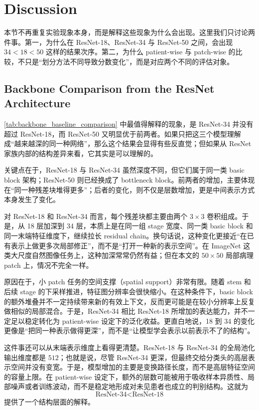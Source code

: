 \section{Discussion}
\label{sec:discussion}

本节不再重复实验现象本身，而是解释这些现象为什么会出现。这里我们只讨论两件事。第一，为什么在 ResNet-18、ResNet-34 与 ResNet-50 之间，会出现 $34 < 18 < 50$ 这样的结果次序。第二，为什么 patient-wise 与 patch-wise 的比较，不只是“划分方法不同导致分数变化”，而是对应两个不同的评估对象。

\subsection{Backbone Comparison from the ResNet Architecture}

\cref{tab:backbone_baseline_comparison} 中最值得解释的现象，是 ResNet-34 并没有超过 ResNet-18，而 ResNet-50 又明显优于前两者。如果只把这三个模型理解成“越来越深的同一种网络”，那么这个结果会显得有些反直觉；但如果从 ResNet 家族内部的结构差异来看，它其实是可以理解的。

关键点在于，ResNet-18 与 ResNet-34 虽然深度不同，但它们属于同一类 basic block 架构；ResNet-50 则已经换成了 bottleneck block。前两者的增加，主要体现在“同一种残差块堆得更多”；后者的变化，则不仅是层数增加，更是中间表示方式本身发生了变化。

对 ResNet-18 和 ResNet-34 而言，每个残差块都主要由两个 $3\times3$ 卷积组成。于是，从 18 层加深到 34 层，本质上是在同一组 stage 宽度、同一类 basic block 和同一末端特征维度下，继续拉长 residual chain。换句话说，这种变化更接近“在已有表示上做更多次局部修正”，而不是“打开一种新的表示空间”。在 ImageNet 这类大尺度自然图像任务上，这种加深常常仍然有益；但在本文的 $50\times50$ 局部病理 patch 上，情况不完全一样。

原因在于，小 patch 任务的空间支撑（spatial support）非常有限。随着 stem 和后续 stage 的下采样推进，特征图分辨率会很快缩小。在这种条件下，basic block 的额外堆叠并不一定持续带来新的有效上下文，反而更可能是在较小分辨率上反复做相似的局部混合。于是，ResNet-34 相比 ResNet-18 所增加的表达能力，并不一定足以稳定转化为 patient-wise 设定下的泛化收益。更直白地说，18 到 34 的变化更像是“把同一种表示做得更深”，而不是“让模型学会表示以前表示不了的结构”。

这件事还可以从末端表示维度上看得更清楚。ResNet-18 与 ResNet-34 的全局池化输出维度都是 $512$；也就是说，尽管 ResNet-34 更深，但最终交给分类头的高层表示空间并没有变宽。于是，模型增加的主要是变换路径长度，而不是高层特征空间的容量上限。在 patient-wise 设定下，额外的层数可能被用于吸收样本异质性、局部噪声或者训练波动，而不是稳定地形成对未见患者也成立的判别结构。这就为
\begin{equation}
    \text{ResNet-34} < \text{ResNet-18}
\end{equation}
提供了一个结构层面的解释。

